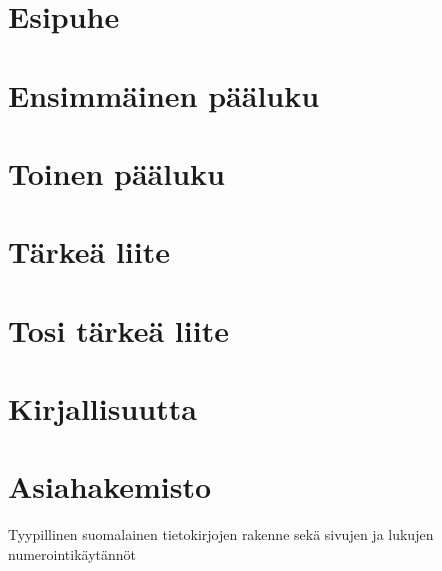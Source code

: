 \begin{esimerkki*}
\begin{koodilohko}
  

  \pagestyle{empty} %

  \cleardoublepage
  \setcounter{tocdepth}{2} %
  \pagestyle{plain}        %
  \tableofcontents         %

  \setcounter{secnumdepth}{-1} %

  \chapter{Esipuhe}
  
  \setcounter{secnumdepth}{2} %

  \chapter{Ensimmäinen pääluku}
  \chapter{Toinen pääluku}

  \appendix
  \chapter{Tärkeä liite}
  \chapter{Tosi tärkeä liite}

  \setcounter{secnumdepth}{-1} %

  \chapter{Kirjallisuutta}
  \printbibliography

  \chapter{Asiahakemisto}
  \printindex

  
\end{koodilohko}
\caption{Tyypillinen suomalainen tietokirjojen rakenne sekä sivujen ja
  lukujen numerointikäytännöt}
\label{esim:tietokirjojen_rakenne}
\end{esimerkki*}
